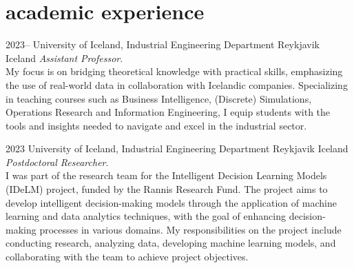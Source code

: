 \section{academic experience}
\begin{entrylist}
\entry
{2023--}
{University of Iceland, Industrial Engineering Department}
{Reykjavik Iceland}
{\emph{Assistant Professor}. \\
My focus is on bridging theoretical knowledge with practical skills, emphasizing the use of real-world data in
collaboration with Icelandic companies. Specializing in teaching courses such as Business Intelligence,
(Discrete) Simulations, Operations Research and Information Engineering, I equip students with the tools and
insights needed to navigate and excel in the industrial sector.
}
\end{entrylist}
\clearpage
\removeaside
\begin{entrylist}
\entry
{2023}
{University of Iceland, Industrial Engineering Department}
{Reykjavik Iceland}
{\emph{Postdoctoral Researcher}. \\
I was part of the research team for the Intelligent Decision Learning Models (IDeLM) project, funded by the Rannis
Research Fund. The project aims to develop intelligent decision-making models through the application of machine
learning and data analytics techniques, with the goal of enhancing decision-making processes in various domains.
My responsibilities on the project include conducting research, analyzing data, developing machine learning models,
and collaborating with the team to achieve project objectives.
}
\end{entrylist}
